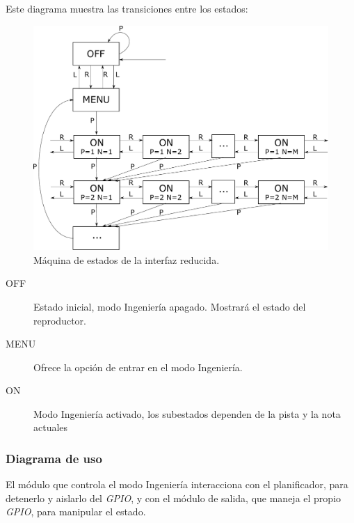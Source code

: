 Este diagrama muestra las transiciones entre los estados:

\smallskip

\begin{figure}[H]
	\noindent \begin{centering}
		\includegraphics[width=\linewidth*3/4]{capitulo4/engineer}
		\par\end{centering}
	\smallskip
	\caption{\label{fig:engineer} Máquina de estados de la interfaz reducida.}
\end{figure} 

\smallskip

\begin{description}
	\item[OFF] Estado inicial, modo Ingeniería apagado. Mostrará el estado del reproductor.
	\item[MENU] Ofrece la opción de entrar en el modo Ingeniería.
	\item[ON] Modo Ingeniería activado, los subestados dependen de la pista y la nota actuales
\end{description}

\subsubsection{Diagrama de uso}

El módulo que controla el modo Ingeniería interacciona con el planificador, para detenerlo y aislarlo del \textit{GPIO}, y con el módulo de salida, que maneja el propio \textit{GPIO}, para manipular el estado.

